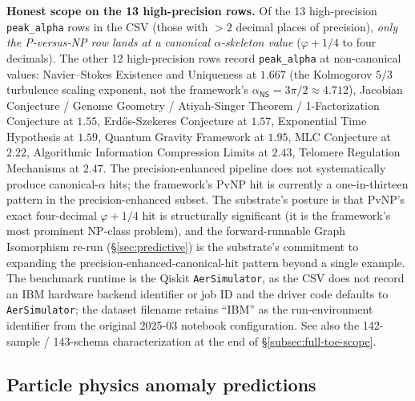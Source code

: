 \documentclass[11pt,a4paper]{amsart}
\theoremstyle{plain}
\theoremstyle{definition}
\begin{document}
\textbf{Honest scope on the 13 high-precision rows.} Of the 13 high-precision \texttt{peak\_alpha} rows in the CSV (those with $> 2$ decimal places of precision), \emph{only the P-versus-NP row lands at a canonical $\alpha$-skeleton value} ($\varphi + 1/4$ to four decimals). The other 12 high-precision rows record \texttt{peak\_alpha} at non-canonical values: Navier--Stokes Existence and Uniqueness at $1.667$ (the Kolmogorov $5/3$ turbulence scaling exponent, not the framework's $\alpha_{\textsf{NS}} = 3\pi/2 \approx 4.712$), Jacobian Conjecture / Genome Geometry / Atiyah-Singer Theorem / 1-Factorization Conjecture at $1.55$, Erd\H{o}s-Szekeres Conjecture at $1.57$, Exponential Time Hypothesis at $1.59$, Quantum Gravity Framework at $1.95$, MLC Conjecture at $2.22$, Algorithmic Information Compression Limits at $2.43$, Telomere Regulation Mechanisms at $2.47$. The precision-enhanced pipeline does not systematically produce canonical-$\alpha$ hits; the framework's PvNP hit is currently a one-in-thirteen pattern in the precision-enhanced subset. The substrate's posture is that PvNP's exact four-decimal $\varphi + 1/4$ hit is structurally significant (it is the framework's most prominent NP-class problem), and the forward-runnable Graph Isomorphism re-run (\S\ref{sec:predictive}) is the substrate's commitment to expanding the precision-enhanced-canonical-hit pattern beyond a single example. The benchmark runtime is the Qiskit \texttt{AerSimulator}, as the CSV does not record an IBM hardware backend identifier or job ID and the driver code defaults to \texttt{AerSimulator}; the dataset filename retains ``IBM'' as the run-environment identifier from the original 2025-03 notebook configuration. See also the 142-sample / 143-schema characterization at the end of \S\ref{subsec:full-toe-scope}.

\subsection{Particle physics anomaly predictions}
\end{document}

